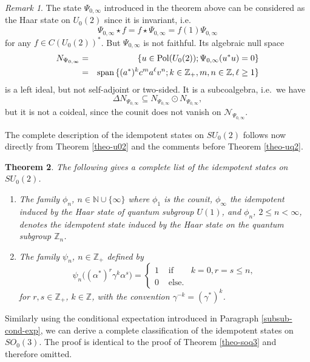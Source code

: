 \documentclass[12pt]{amsart}
\newtheorem{theorem}{Theorem}[section]
\theoremstyle{definition}
\theoremstyle{remark}
\newtheorem{remark}[theorem]{Remark}
\numberwithin{equation}{section}
\begin{document}
\begin{remark}
The state $\Psi_{0,\infty}$ introduced in the theorem above can be considered as the Haar state on $U_0(2)$
since it is invariant, i.e.\
\[
\Psi_{0,\infty}\star f = f\star \Psi_{0,\infty} = f(1) \Psi_{0,\infty}
\]
for any $f\in C(U_0(2))^*$. But $\Psi_{0,\infty}$ is not faithful. Its algebraic null space
\begin{eqnarray*}
N_{\Psi_{0,\infty}} &=& \{u\in {\rm
  Pol}(U_0(2));\Psi_{0,\infty}(u^*u)=0\} \\
&=& {\rm span}\,\{(a^*)^kc^m a^\ell v^n;
k\in\mathbb{Z}_+,m,n\in\mathbb{Z},\ell\ge 1\}
\end{eqnarray*}
is a left ideal, but not self-adjoint or two-sided. It is a subcoalgebra,
i.e.\ we have
\[
\Delta N_{\Psi_{0,\infty}} \subseteq
N_{\Psi_{0,\infty}}\odot N_{\Psi_{0,\infty}},
\]
but it is not a coideal, since the counit does not vanish on $\mathcal{N}_{\Psi_{0,\infty}}$.
\end{remark}

The complete description of the
idempotent states on $SU_0(2)$ follows now directly from Theorem \ref{theo-u02} and the comments before Theorem \ref{theo-uq2}.

\begin{theorem}\label{theo-su02}
The following gives a complete list of the idempotent states on $SU_0(2)$.
\begin{enumerate}
\item
The family $\phi_n$, $n\in\mathbb{N}\cup\{\infty\}$ where $\phi_1$ is the
counit, $\phi_\infty$ the idempotent induced by the Haar state
of quantum subgroup $U(1)$, and $\phi_n$, $2\le n < \infty$, denotes the
idempotent state induced by the Haar state on the quantum subgroup $\mathbb{Z}_n$.
\item
The family $\psi_n$, $n\in\mathbb{Z}_+$ defined by
\[
\psi_n\big((\alpha^*)^r \gamma^k \alpha^s\big) =
\left\{\begin{array}{lll}
1 & \mbox{ if } & k=0, r=s\le n, \\
0 & \mbox{ else.}&
\end{array}\right.
\]
for $r,s\in\mathbb{Z}_+$, $k\in\mathbb{Z}$, with the convention $\gamma^{-k}=(\gamma^*)^k$.
\end{enumerate}
\end{theorem}

Similarly using the conditional expectation introduced in Paragraph
\ref{subsub-cond-exp}, we can derive a complete classification of the
idempotent states on $SO_0(3)$. The proof is identical to the proof of Theorem
\ref{theo-soq3} and therefore omitted.
\end{document}
